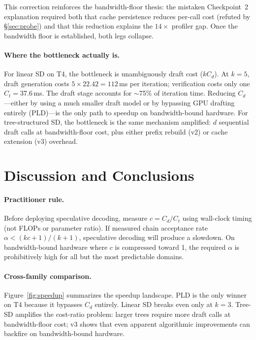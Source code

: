 \documentclass[letterpaper,twocolumn,10pt]{article}
\begin{document}
This correction reinforces the bandwidth-floor thesis: the mistaken Checkpoint~2 explanation required both that cache persistence reduces per-call cost (refuted by \S\ref{sec:probe}) and that this reduction explains the $14\times$ profiler gap. Once the bandwidth floor is established, both legs collapse.

\paragraph{Where the bottleneck actually is.}
For linear SD on T4, the bottleneck is unambiguously draft cost ($kC_d$).
At $k{=}5$, draft generation costs $5 \times 22.42 = 112$\,ms per iteration; verification costs only one $C_t = 37.6$\,ms.
The draft stage accounts for $\sim$75\% of iteration time.
Reducing $C_d$---either by using a much smaller draft model or by bypassing GPU drafting entirely (PLD)---is the only path to speedup on bandwidth-bound hardware.
For tree-structured SD, the bottleneck is the same mechanism amplified: $d$ sequential draft calls at bandwidth-floor cost, plus either prefix rebuild (v2) or cache extension (v3) overhead.


\section{Discussion and Conclusions}

\paragraph{Practitioner rule.}
Before deploying speculative decoding, measure $c = C_d/C_t$ using wall-clock timing (not FLOPs or parameter ratio).
If measured chain acceptance rate $\alpha < (kc + 1)/(k + 1)$, speculative decoding will produce a slowdown.
On bandwidth-bound hardware where $c$ is compressed toward 1, the required $\alpha$ is prohibitively high for all but the most predictable domains.

\paragraph{Cross-family comparison.}
Figure~\ref{fig:speedup} summarizes the speedup landscape.
PLD is the only winner on T4 because it bypasses $C_d$ entirely.
Linear SD breaks even only at $k{=}3$.
Tree-SD amplifies the cost-ratio problem: larger trees require more draft calls at bandwidth-floor cost; v3 shows that even apparent algorithmic improvements can backfire on bandwidth-bound hardware.
\end{document}
